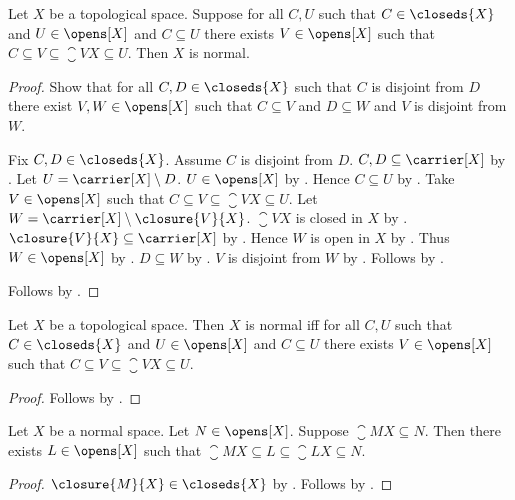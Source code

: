 \begin{proposition}\label{closed_shrinking_implies_normal}
    Let $X$ be a topological space.
    Suppose for all $C,U$ such that $C\in\closeds{X}$ and
        $U\in\opens[X]$ and $C\subseteq U$ there exists
        $V\in\opens[X]$ such that
        $C\subseteq V\subseteq\closure{V}{X}\subseteq U$.
    Then $X$ is normal.
\end{proposition}
\begin{proof}
    Show that for all $C,D\in\closeds{X}$ such that
        $C$ is disjoint from $D$ there exist $V,W\in\opens[X]$ such that
        $C\subseteq V$ and $D\subseteq W$ and
        $V$ is disjoint from $W$.
    \begin{subproof}
        Fix $C,D\in\closeds{X}$.
        Assume $C$ is disjoint from $D$.
        $C,D\subseteq\carrier[X]$ by .
        Let $U=\carrier[X]\setminus D$.
        $U\in\opens[X]$ by .
        Hence $C\subseteq U$
            by .
        Take $V\in\opens[X]$ such that
            $C\subseteq V\subseteq\closure{V}{X}\subseteq U$.
        Let $W=\carrier[X]\setminus\closure{V}{X}$.
        $\closure{V}{X}$ is closed in $X$
            by .
        $\closure{V}{X}\subseteq\carrier[X]$
            by .
        Hence $W$ is open in $X$
            by .
        Thus $W\in\opens[X]$ by .
        $D\subseteq W$ by .
        $V$ is disjoint from $W$
            by .
        Follows by \auto.
    \end{subproof}
    Follows by .
\end{proof}

\begin{theorem}\label{normal_iff_closed_shrinking}
    Let $X$ be a topological space.
    Then $X$ is normal iff for all $C,U$ such that
        $C\in\closeds{X}$ and $U\in\opens[X]$ and $C\subseteq U$
        there exists $V\in\opens[X]$ such that
        $C\subseteq V\subseteq\closure{V}{X}\subseteq U$.
\end{theorem}
\begin{proof}
    Follows by
        .
\end{proof}

\begin{corollary}\label{normal_insertion}
    Let $X$ be a normal space.
    Let $N\in\opens[X]$.
    Suppose $\closure{M}{X}\subseteq N$.
    Then there exists $L\in\opens[X]$ such that
        $\closure{M}{X}\subseteq L\subseteq\closure{L}{X}\subseteq N$.
\end{corollary}
\begin{proof}
    $\closure{M}{X}\in\closeds{X}$ by .
    Follows by .
\end{proof}


